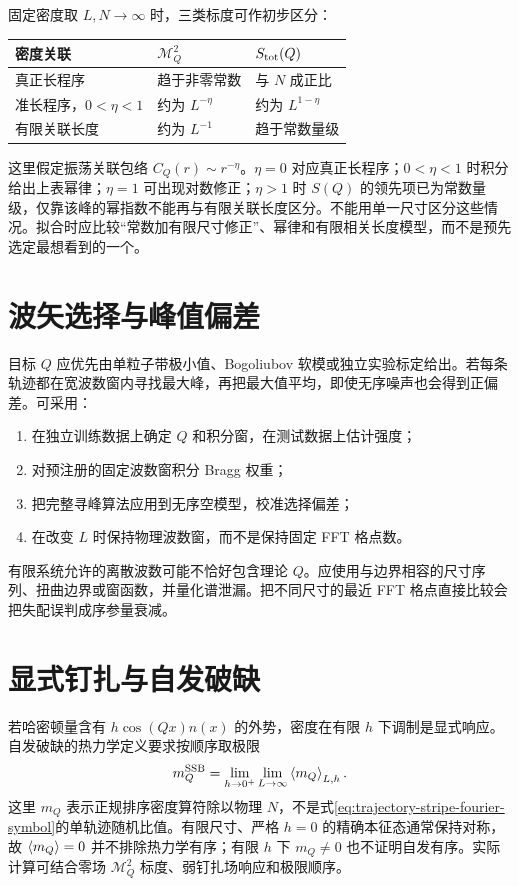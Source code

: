 固定密度取 $L,N\to\infty$ 时，三类标度可作初步区分：
\begin{center}
\begin{tabularx}{\textwidth}{p{}XX}
\toprule
密度关联 & $\mathcal M_Q^2$ & $S_{\rm tot}(Q)$ \\
\midrule
真正长程序 & 趋于非零常数 & 与 $N$ 成正比 \\
准长程序，$0<\eta<1$ & 约为 $L^{-\eta}$ & 约为 $L^{1-\eta}$ \\
有限关联长度 & 约为 $L^{-1}$ & 趋于常数量级 \\
\bottomrule
\end{tabularx}
\end{center}
这里假定振荡关联包络 $C_Q(r)\sim r^{-\eta}$。$\eta=0$ 对应真正长程序；$0<\eta<1$ 时积分给出上表幂律；$\eta=1$ 可出现对数修正；$\eta>1$ 时 $S(Q)$ 的领先项已为常数量级，仅靠该峰的幂指数不能再与有限关联长度区分。不能用单一尺寸区分这些情况。拟合时应比较“常数加有限尺寸修正”、幂律和有限相关长度模型，而不是预先选定最想看到的一个。

\section{波矢选择与峰值偏差}

目标 $Q$ 应优先由单粒子带极小值、Bogoliubov 软模或独立实验标定给出。若每条轨迹都在宽波数窗内寻找最大峰，再把最大值平均，即使无序噪声也会得到正偏差。可采用：
\begin{enumerate}
  \item 在独立训练数据上确定 $Q$ 和积分窗，在测试数据上估计强度；
  \item 对预注册的固定波数窗积分 Bragg 权重；
  \item 把完整寻峰算法应用到无序空模型，校准选择偏差；
  \item 在改变 $L$ 时保持物理波数窗，而不是保持固定 FFT 格点数。
\end{enumerate}

有限系统允许的离散波数可能不恰好包含理论 $Q$。应使用与边界相容的尺寸序列、扭曲边界或窗函数，并量化谱泄漏。把不同尺寸的最近 FFT 格点直接比较会把失配误判成序参量衰减。

\section{显式钉扎与自发破缺}

若哈密顿量含有 $h\cos(Qx)\hat n(x)$ 的外势，密度在有限 $h$ 下调制是显式响应。自发破缺的热力学定义要求按顺序取极限
\begin{equation}
  m_Q^{\rm SSB}=\lim_{h\to0^+}\lim_{L\to\infty}\left\langle m_Q\right\rangle_{L,h}.
  \label{eq:ssb-order-of-limits}
\end{equation}
这里 $m_Q$ 表示正规排序密度算符除以物理 $N$，不是式\eqref{eq:trajectory-stripe-fourier-symbol}的单轨迹随机比值。有限尺寸、严格 $h=0$ 的精确本征态通常保持对称，故 $\left\langle m_Q\right\rangle=0$ 并不排除热力学有序；有限 $h$ 下 $m_Q\neq0$ 也不证明自发有序。实际计算可结合零场 $\mathcal M_Q^2$ 标度、弱钉扎场响应和极限顺序。

